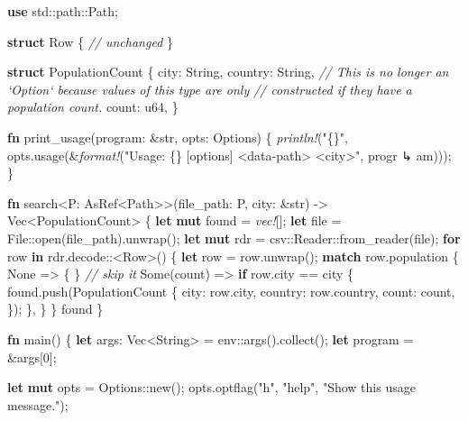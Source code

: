\documentclass[a4paper,]{book}
\newenvironment{Shaded}{\begin{snugshade}}{\end{snugshade}}
\newcommand{\KeywordTok}[1]{\textcolor[rgb]{0.13,0.29,0.53}{\textbf{{#1}}}}
\newcommand{\DataTypeTok}[1]{\textcolor[rgb]{0.13,0.29,0.53}{{#1}}}
\newcommand{\DecValTok}[1]{\textcolor[rgb]{0.00,0.00,0.81}{{#1}}}
\newcommand{\ConstantTok}[1]{\textcolor[rgb]{0.00,0.00,0.00}{{#1}}}
\newcommand{\StringTok}[1]{\textcolor[rgb]{0.31,0.60,0.02}{{#1}}}
\newcommand{\CommentTok}[1]{\textcolor[rgb]{0.56,0.35,0.01}{\textit{{#1}}}}
\newcommand{\PreprocessorTok}[1]{\textcolor[rgb]{0.56,0.35,0.01}{\textit{{#1}}}}
\newcommand{\NormalTok}[1]{{#1}}
\begin{document}
\begin{Shaded}
\begin{Highlighting}[]
\KeywordTok{use} \NormalTok{std::path::Path;}

\KeywordTok{struct} \NormalTok{Row \{}
    \CommentTok{// unchanged}
\NormalTok{\}}

\KeywordTok{struct} \NormalTok{PopulationCount \{}
    \NormalTok{city: }\DataTypeTok{String}\NormalTok{,}
    \NormalTok{country: }\DataTypeTok{String}\NormalTok{,}
    \CommentTok{// This is no longer an `Option` because values of this type are only}
    \CommentTok{// constructed if they have a population count.}
    \NormalTok{count: }\DataTypeTok{u64}\NormalTok{,}
\NormalTok{\}}

\KeywordTok{fn} \NormalTok{print_usage(program: &}\DataTypeTok{str}\NormalTok{, opts: Options) \{}
    \PreprocessorTok{println!}\NormalTok{(}\StringTok{"\{\}"}\NormalTok{, opts.usage(&}\PreprocessorTok{format!}\NormalTok{(}\StringTok{"Usage: \{\} [options] <data-path> <city>"}\NormalTok{, progr}
\NormalTok{↳ am)));}
\NormalTok{\}}

\KeywordTok{fn} \NormalTok{search<P: AsRef<Path>>(file_path: P, city: &}\DataTypeTok{str}\NormalTok{) -> }\DataTypeTok{Vec}\NormalTok{<PopulationCount> \{}
    \KeywordTok{let} \KeywordTok{mut} \NormalTok{found = }\PreprocessorTok{vec!}\NormalTok{[];}
    \KeywordTok{let} \NormalTok{file = File::open(file_path).unwrap();}
    \KeywordTok{let} \KeywordTok{mut} \NormalTok{rdr = csv::Reader::from_reader(file);}
    \KeywordTok{for} \NormalTok{row }\KeywordTok{in} \NormalTok{rdr.decode::<Row>() \{}
        \KeywordTok{let} \NormalTok{row = row.unwrap();}
        \KeywordTok{match} \NormalTok{row.population \{}
            \ConstantTok{None} \NormalTok{=> \{ \} }\CommentTok{// skip it}
            \ConstantTok{Some}\NormalTok{(count) => }\KeywordTok{if} \NormalTok{row.city == city \{}
                \NormalTok{found.push(PopulationCount \{}
                    \NormalTok{city: row.city,}
                    \NormalTok{country: row.country,}
                    \NormalTok{count: count,}
                \NormalTok{\});}
            \NormalTok{\},}
        \NormalTok{\}}
    \NormalTok{\}}
    \NormalTok{found}
\NormalTok{\}}

\KeywordTok{fn} \NormalTok{main() \{}
    \KeywordTok{let} \NormalTok{args: }\DataTypeTok{Vec}\NormalTok{<}\DataTypeTok{String}\NormalTok{> = env::args().collect();}
    \KeywordTok{let} \NormalTok{program = &args[}\DecValTok{0}\NormalTok{];}

    \KeywordTok{let} \KeywordTok{mut} \NormalTok{opts = Options::new();}
    \NormalTok{opts.optflag(}\StringTok{"h"}\NormalTok{, }\StringTok{"help"}\NormalTok{, }\StringTok{"Show this usage message."}\NormalTok{);}


\end{Highlighting}
\end{Shaded}
\end{document}
